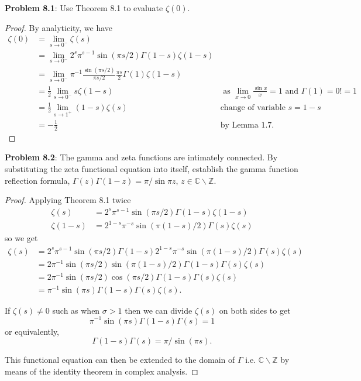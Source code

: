 \documentclass[12pt]{article}
\newcommand{\Z}{\mathbb{Z}}
\newcommand{\C}{\mathbb{C}}
\begin{document}
\fi

\textbf{Problem 8.1}: Use Theorem 8.1 to evaluate $\zeta(0)$.

\begin{proof}
By analyticity, we have
\begin{align*}
\zeta(0) &= \lim_{s \rightarrow 0^-} \zeta(s)\\
&= \lim_{s \rightarrow 0^-} 2^s \pi^{s-1} \sin(\pi s/ 2) \Gamma(1 - s) \zeta(1 - s)\\
&= \lim_{s \rightarrow 0^-} \pi^{-1} \frac{\sin(\pi s/ 2)}{\pi s / 2} \frac{\pi s}{2} \Gamma(1) \zeta(1 - s)\\
&= \frac{1}{2} \lim_{s \rightarrow 0^-} s \zeta(1 - s) &\text{ as } \lim_{x \rightarrow 0} \frac{\sin x}{x} = 1 \text{ and } \Gamma(1) = 0! = 1\\
&= \frac{1}{2} \lim_{s \rightarrow 1^+} (1 - s) \zeta(s) &\text{change of variable } s = 1 - s\\
&= -\frac{1}{2} &\text{by Lemma 1.7}.
\end{align*}
\end{proof}

\textbf{Problem 8.2}: The gamma and zeta functions are intimately connected. By substituting the zeta functional equation into itself, establish the gamma function reflection formula, $\Gamma(z) \Gamma(1-z) = \pi / \sin \pi z$, $z \in \C \backslash \Z$.

\begin{proof}
Applying Theorem 8.1 twice
\begin{align*}
\zeta(s) &= 2^s \pi^{s-1} \sin(\pi s/ 2) \Gamma(1 - s) \zeta(1 - s)\\
\zeta(1 - s) &= 2^{1 - s} \pi^{-s} \sin(\pi (1 - s)/ 2) \Gamma(s) \zeta(s)
\end{align*}
so we get
\begin{align*}
\zeta(s) &= 2^s \pi^{s-1} \sin(\pi s/ 2) \Gamma(1 - s) 2^{1 - s} \pi^{-s} \sin(\pi (1 - s)/ 2) \Gamma(s) \zeta(s)\\
&= 2 \pi^{-1} \sin(\pi s/ 2) \sin(\pi (1 - s)/ 2) \Gamma(1 - s) \Gamma(s) \zeta(s)\\
&= 2 \pi^{-1} \sin(\pi s/ 2) \cos(\pi s/ 2) \Gamma(1 - s) \Gamma(s) \zeta(s)\\
&= \pi^{-1} \sin(\pi s) \Gamma(1 - s) \Gamma(s) \zeta(s).
\end{align*}

If $\zeta(s) \not= 0$ such as when $\sigma > 1$ then we can divide $\zeta(s)$ on both sides to get
$$\pi^{-1} \sin(\pi s) \Gamma(1 - s) \Gamma(s) = 1$$
or equivalently,
$$\Gamma(1 - s) \Gamma(s) = \pi / \sin(\pi s).$$

This functional equation can then be extended to the domain of $\Gamma$ i.e. $\C \backslash \Z$ by means of the identity theorem in complex analysis.
\end{proof}

\unless\ifdefined\IsMainDocument
\end{document}
